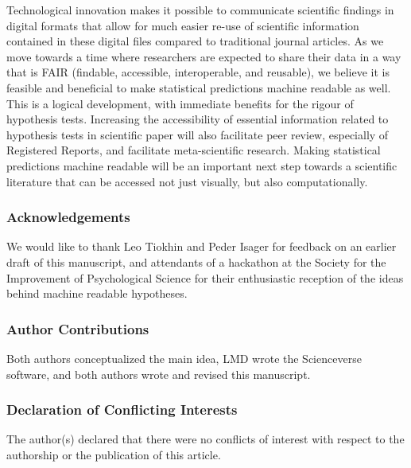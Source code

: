 \documentclass[doc,floatsintext]{apa6}
\begin{document}
Technological innovation makes it possible to communicate scientific findings in digital formats that allow for much easier re-use of scientific information contained in these digital files compared to traditional journal articles. As we move towards a time where researchers are expected to share their data in a way that is FAIR (findable, accessible, interoperable, and reusable), we believe it is feasible and beneficial to make statistical predictions machine readable as well. This is a logical development, with immediate benefits for the rigour of hypothesis tests. Increasing the accessibility of essential information related to hypothesis tests in scientific paper will also facilitate peer review, especially of Registered Reports, and facilitate meta-scientific research. Making statistical predictions machine readable will be an important next step towards a scientific literature that can be accessed not just visually, but also computationally.

\newpage

\hypertarget{acknowledgements}{%
\subsubsection{Acknowledgements}\label{acknowledgements}}

We would like to thank Leo Tiokhin and Peder Isager for feedback on an earlier draft of this manuscript, and attendants of a hackathon at the Society for the Improvement of Psychological Science for their enthusiastic reception of the ideas behind machine readable hypotheses.

\hypertarget{author-contributions}{%
\subsubsection{Author Contributions}\label{author-contributions}}

Both authors conceptualized the main idea, LMD wrote the Scienceverse software, and both authors wrote and revised this manuscript.

\hypertarget{declaration-of-conflicting-interests}{%
\subsubsection{Declaration of Conflicting Interests}\label{declaration-of-conflicting-interests}}

The author(s) declared that there were no conflicts of interest with respect to the authorship or the publication of this article.
\end{document}
